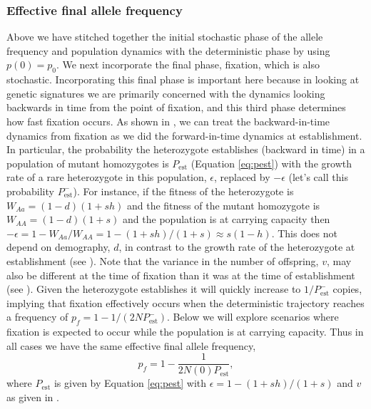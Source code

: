 \documentclass[]{article}
\begin{document}
\subsubsection*{Effective final allele frequency}
\label{sec:final_frequency}

Above we have stitched together the initial stochastic phase of the allele frequency and population dynamics with the deterministic phase by using $p(0)=p_0$. 
We next incorporate the final phase, fixation, which is also stochastic.
Incorporating this final phase is important here \citep[as opposed to studies that predict only the forward-time dynamics; e.g.,][]{orr2014population} because in looking at genetic signatures we are primarily concerned with the dynamics looking backwards in time from the point of fixation, and this third phase determines how fast fixation occurs.
As shown in \cite{martin2015simple}, we can treat the backward-in-time dynamics from fixation as we did the forward-in-time dynamics at establishment. 
In particular, the probability the heterozygote establishes (backward in time) in a population of mutant homozygotes is $P_\mathrm{est}$ (Equation \ref{eq:pest}) with the growth rate of a rare heterozygote in this population, $\epsilon$, replaced by $-\epsilon$ (let's call this probability $P_\mathrm{est}^-$).
For instance, if the fitness of the heterozygote is $W_{Aa} = (1-d)(1+ s h)$ and the fitness of the mutant homozygote is $W_{AA} = (1-d)(1+s)$ and the population is at carrying capacity then $-\epsilon = 1 - W_{Aa}/W_{AA}=1 - (1+ s h)/(1+ s) \approx s(1-h)$.
This does not depend on demography, $d$, in contrast to the growth rate of the heterozygote at establishment (see ).
Note that the variance in the number of offspring, $v$, may also be different at the time of fixation than it was at the time of establishment (see ).
Given the heterozygote establishes it will quickly increase to $1/P_\mathrm{est}^-$ copies, implying that fixation effectively occurs when the deterministic trajectory reaches a frequency of $p_f = 1-1/(2 N P_\mathrm{est}^-)$.
Below we will explore scenarios where fixation is expected to occur while the population is at carrying capacity. 
Thus in all cases we have the same effective final allele frequency,
\begin{equation}\label{eq:pf}
p_f = 1 - \frac{1}{2 N(0) P_\mathrm{est}},
\end{equation}
where $P_\mathrm{est}$ is given by Equation \ref{eq:pest} with $\epsilon = 1 - (1 + s h)/(1 +  s)$ and $v$ as given in .
\end{document}
